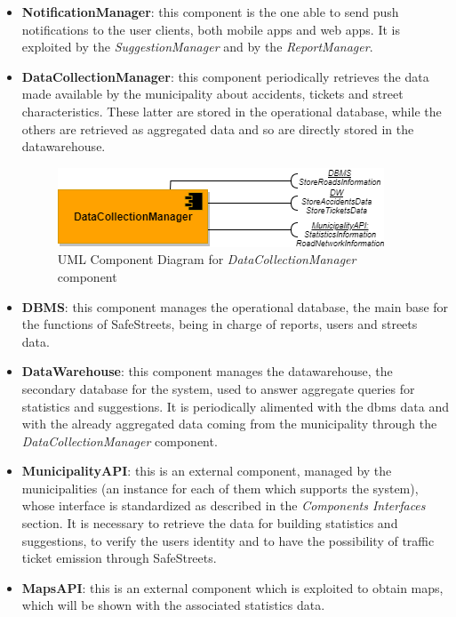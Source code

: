 \documentclass[a4paper]{report}
\begin{document}
\begin{itemize}
\item \textbf{NotificationManager}: this component is the one able to send push notifications to the user clients, both mobile apps and web apps. It is exploited by the \textit{SuggestionManager} and by the \textit{ReportManager}.

\item \textbf{DataCollectionManager}: this component periodically retrieves the data made available by the municipality about accidents, tickets and street characteristics. These latter are stored in the operational database, while the others are retrieved as aggregated data and so are directly stored in the datawarehouse.

\begin{figure}[htp]
\includegraphics[width=\textwidth]{DataCollectionManager2}
\caption{UML Component Diagram for \textit{DataCollectionManager} component}
\label{fig:datacollectionmgr-component}
\end{figure}

\item \textbf{DBMS}: this component manages the operational database, the main base for the functions of SafeStreets, being in charge of reports, users and streets data.

\item \textbf{DataWarehouse}: this component manages the datawarehouse, the secondary database for the system, used to answer aggregate queries for statistics and suggestions. It is periodically alimented with the dbms data and with the already aggregated data coming from the municipality through the \textit{DataCollectionManager} component.

\item \textbf{MunicipalityAPI}: this is an external component, managed by the municipalities (an instance for each of them which supports the system), whose interface is standardized as described in the \textit{Components Interfaces} section. It is necessary to retrieve the data for building statistics and suggestions, to verify the users identity and to have the possibility of traffic ticket emission through SafeStreets.

\item \textbf{MapsAPI}: this is an external component which is exploited to obtain maps, which will be shown with the associated statistics data.


\end{itemize}
\end{document}
